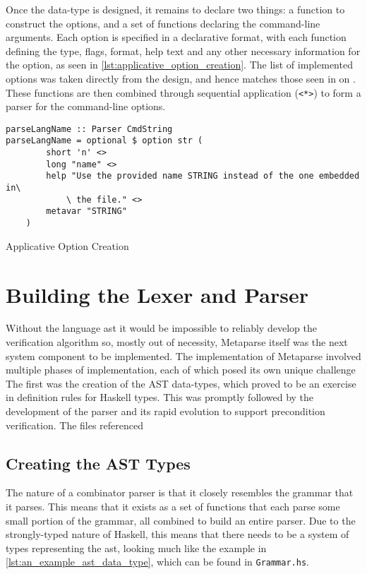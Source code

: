 Once the data-type is designed, it remains to declare two things: a function to construct the options, and a set of functions declaring the command-line arguments.
Each option is specified in a declarative format, with each function defining the type, flags, format, help text and any other necessary information for the option, as seen in \autoref{lst:applicative_option_creation}.
The list of implemented options was taken directly from the design, and hence matches those seen in  on .
These functions are then combined through sequential application (\texttt{<*>}) to form a parser for the command-line options.

\begin{listing}[!htb]
\begin{verbatim}
parseLangName :: Parser CmdString
parseLangName = optional $ option str (
        short 'n' <>
        long "name" <>
        help "Use the provided name STRING instead of the one embedded in\
            \ the file." <>
        metavar "STRING"
    )
\end{verbatim}
\caption{Applicative Option Creation}
\label{lst:applicative_option_creation}
\end{listing}



\section{Building the Lexer and Parser} %
\label{sec:building_the_lexer_and_parser}

Without the language \gls{ast} it would be impossible to reliably develop the verification algorithm so, mostly out of necessity, Metaparse itself was the next system component to be implemented. 
The implementation of Metaparse involved multiple phases of implementation, each of which posed its own unique challenge
The first was the creation of the AST data-types, which proved to be an exercise in definition rules for Haskell types.
This was promptly followed by the development of the parser and its rapid evolution to support precondition verification.
The files referenced 

\subsection{Creating the AST Types} %
\label{sub:creating_the_ast_types}
The nature of a combinator parser is that it closely resembles the grammar that it parses. 
This means that it exists as a set of functions that each parse some small portion of the grammar, all combined to build an entire parser. 
Due to the strongly-typed nature of Haskell, this means that there needs to be a system of types representing the \gls{ast}, looking much like the example in \autoref{lst:an_example_ast_data_type}, which can be found in \texttt{Grammar.hs}.\\

